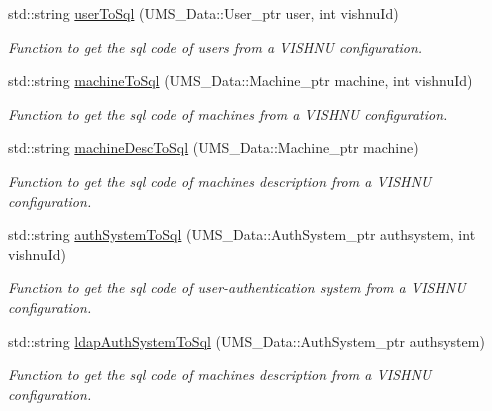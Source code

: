 \begin{DoxyCompactItemize}
\item 
std::string \hyperlink{classConfigurationServer_adfcf50dc485096fe1d109142d0acaaa2}{userToSql} (UMS\_\-Data::User\_\-ptr user, int vishnuId)
\begin{DoxyCompactList}\small\item\em Function to get the sql code of users from a VISHNU configuration. \item\end{DoxyCompactList}\item 
std::string \hyperlink{classConfigurationServer_a6899508cf595a37a05d90b9efe8c9358}{machineToSql} (UMS\_\-Data::Machine\_\-ptr machine, int vishnuId)
\begin{DoxyCompactList}\small\item\em Function to get the sql code of machines from a VISHNU configuration. \item\end{DoxyCompactList}\item 
std::string \hyperlink{classConfigurationServer_a10dc6a2581fce8e24144f9f49e08d58f}{machineDescToSql} (UMS\_\-Data::Machine\_\-ptr machine)
\begin{DoxyCompactList}\small\item\em Function to get the sql code of machines description from a VISHNU configuration. \item\end{DoxyCompactList}\item 
std::string \hyperlink{classConfigurationServer_a2015835e881f8bf36b3a82e2bbee6b95}{authSystemToSql} (UMS\_\-Data::AuthSystem\_\-ptr authsystem, int vishnuId)
\begin{DoxyCompactList}\small\item\em Function to get the sql code of user-\/authentication system from a VISHNU configuration. \item\end{DoxyCompactList}\item 
std::string \hyperlink{classConfigurationServer_a8c5b91d69b6dafb7ec822d3c31389178}{ldapAuthSystemToSql} (UMS\_\-Data::AuthSystem\_\-ptr authsystem)
\begin{DoxyCompactList}\small\item\em Function to get the sql code of machines description from a VISHNU configuration. \item\end{DoxyCompactList}\end{DoxyCompactItemize}
